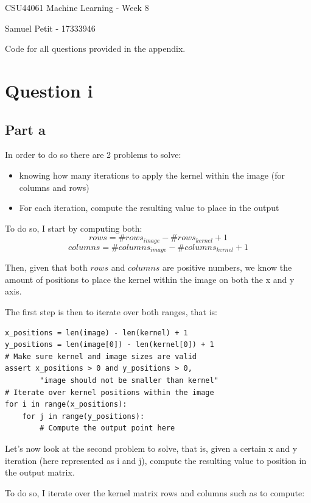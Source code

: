 \documentclass[10pt]{article}
\begin{document}
{\centering
    CSU44061 Machine Learning - Week 8
    \par
    Samuel Petit - 17333946
    \par
    Code for all questions provided in the appendix.
}
\section*{Question i}
\subsection*{Part a}
In order to do so there are 2 problems to solve:

\begin{itemize}
    \item knowing how many iterations to apply the kernel within the image (for columns and rows)
    \item For each iteration, compute the resulting value to place in the output
\end{itemize}

To do so, I start by computing both:
\begin{equation*}
    rows = \# rows_{image} - \# rows_{kernel} + 1
\end{equation*}
\begin{equation*}
    columns = \# columns_{image} - \# columns_{kernel} + 1
\end{equation*}

Then, given that both $rows$ and $columns$ are positive numbers, we know
the amount of positions to place the kernel within the image on both the x and y axis.

The first step is then to iterate over both ranges, that is:
\begin{lstlisting}
x_positions = len(image) - len(kernel) + 1
y_positions = len(image[0]) - len(kernel[0]) + 1
# Make sure kernel and image sizes are valid
assert x_positions > 0 and y_positions > 0, 
        "image should not be smaller than kernel"
# Iterate over kernel positions within the image
for i in range(x_positions):
    for j in range(y_positions):
        # Compute the output point here
\end{lstlisting}

Let's now look at the second problem to solve, that is, given a certain x and y
iteration (here represented as i and j), compute the resulting value to position
in the output matrix.

To do so, I iterate over the kernel matrix rows and columns such as to compute:
\end{document}

